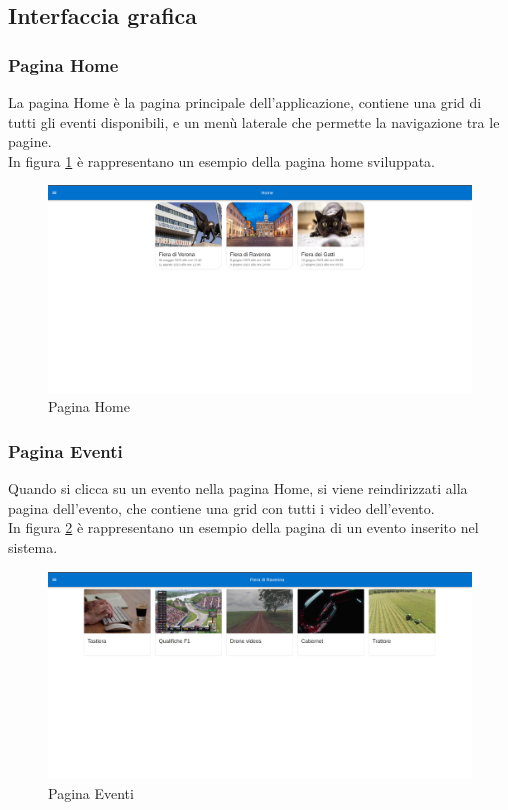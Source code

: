 \subsection{Interfaccia grafica}
\subsubsection{Pagina Home}
La pagina Home è la pagina principale dell'applicazione, contiene una grid di tutti gli eventi disponibili, e un menù laterale che permette la navigazione tra le pagine.\\
In figura \ref{fig:home} è rappresentano un esempio della pagina home sviluppata.
\begin{figure}[H]
    \centering
    \includegraphics[width=1\textwidth]{images/interface/home.png}
    \caption{Pagina Home}
    \label{fig:home}
\end{figure}
\subsubsection{Pagina Eventi}
Quando si clicca su un evento nella pagina Home, si viene reindirizzati alla pagina dell'evento, che contiene una grid con tutti i video dell'evento.\\
In figura \ref{fig:eventi} è rappresentano un esempio della pagina di un evento inserito nel sistema.
\begin{figure}[H]
    \centering
    \includegraphics[width=1\textwidth]{images/interface/events.png}
    \caption{Pagina Eventi}
    \label{fig:eventi}
\end{figure}
